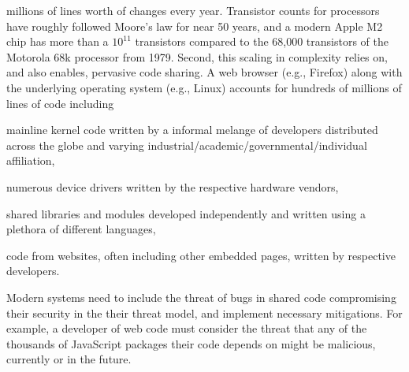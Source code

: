 millions of lines worth of changes every year.
Transistor counts for processors have roughly followed Moore's law for
near 50 years, and a modern Apple M2 chip has more than a $10^{11}$
transistors compared to the 68,000 transistors of the Motorola 68k processor
from 1979.
Second, this scaling in complexity relies on, and also enables, pervasive code
sharing.
A web browser (e.g., Firefox) along with the underlying operating 
system (e.g., Linux) accounts for hundreds of millions of lines of code
including
\begin{inparaenum}
      \item mainline kernel code written by a informal melange of developers
            distributed across the globe and varying 
            industrial/academic/governmental/individual affiliation,
      \item numerous device drivers written by the respective hardware 
            vendors,
      \item shared libraries and modules developed independently and 
            written using a plethora of different languages,
      \item code from websites, often including other embedded pages,
            written by respective developers.
\end{inparaenum}
Modern systems need to include the threat of bugs in shared code
compromising their security in the their threat model, and implement
necessary mitigations.
For example, a developer of web code must consider the threat that any of the
thousands of JavaScript packages their code depends on might be malicious,
currently or in the future.


